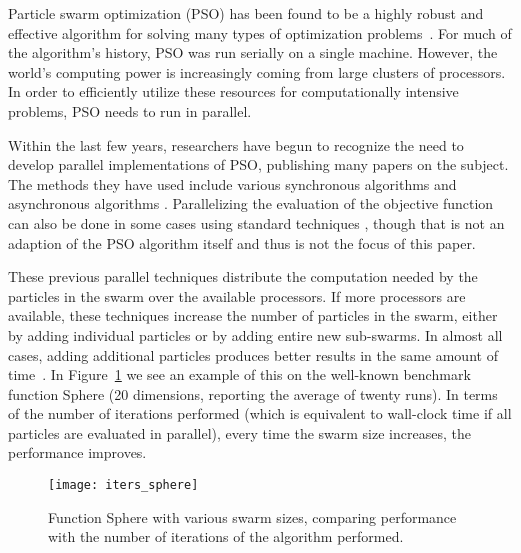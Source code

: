 \documentclass[smallcondensed]{svjour3}
\newcommand{\fig}[1]{Figure~\ref{fig:#1}}
\begin{document}
Particle swarm optimization (PSO) has been found to be a highly robust and
effective algorithm for solving many types of optimization
problems~\citep{poli-2008-pso-applications,
poli-2007-particle-swarm-optimization}.  For much of the algorithm's history,
PSO was run serially on a single machine.  However, the world's computing power
is increasingly coming from large clusters of processors.  In order to
efficiently utilize these resources for computationally intensive problems, PSO
needs to run in parallel.

Within the last few years, researchers have begun to recognize the need to
develop parallel implementations of PSO, publishing many papers on the subject.
The methods they have used include various synchronous algorithms
\citep{parsopoulos-2004-parallel-vector-evaluated-pso} and asynchronous
algorithms \citep{mostaghim-2006-multi-objective-pso-on-grids}.  Parallelizing
the evaluation of the objective function can also be done in some cases using
standard techniques \citep{grama-2003-intro-to-parallel-computing}, though that
is not an adaption of the PSO algorithm itself and thus is not the focus of
this paper.

These previous parallel techniques distribute the computation needed by the
particles in the swarm over the available processors.  If more processors are
available, these techniques increase the number of particles in the swarm,
either by adding individual particles or by adding entire new sub-swarms.  In
almost all cases, adding additional particles produces better results in the
same amount of time~\citep{mcnabb-2009-large-particle-swarms}.  In
\fig{iters-sphere} we see an example of this on the well-known benchmark
function Sphere (20 dimensions, reporting the average of twenty runs).  In
terms of the number of iterations performed (which is equivalent to wall-clock
time if all particles are evaluated in parallel), every time the swarm size
increases, the performance improves.

\begin{figure}
  \centering
  \texttt{[image: iters\_sphere]}
  \caption{Function Sphere with various swarm sizes, comparing performance with
  the number of iterations of the algorithm performed.}
  \label{fig:iters-sphere}
\end{figure}
\end{document}
